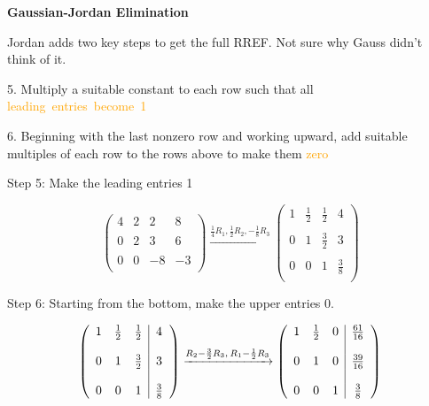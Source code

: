 \documentclass{article}
\begin{document}
\vspace{10pt}

\textbf{Gaussian-Jordan Elimination}

Jordan adds two key steps to get the full RREF. Not sure why Gauss didn't think of it.

5. Multiply a suitable constant to each row such that all \mbox{\textcolor{orange}{leading entries become 1}}

6. Beginning with the last nonzero row and working upward, add suitable multiples of each row to the rows above to make them \textcolor{orange}{zero}

\vspace{10pt}

Step 5: Make the leading entries 1

\[
\left(
\begin{array}{ccc|c}
4 & 2 & 2 & 8 \\ &&& \\
0 & 2 & 3 & 6 \\ &&& \\ 
0 & 0 & -8 & -3 \\
\end{array}
\right)
\xrightarrow{\frac{1}{4}R_1, \frac{1}{2}R_2, -\frac{1}{8}R_3} 
\left(
\begin{array}{ccc|c}
1 & \frac{1}{2} & \frac{1}{2} & 4 \\ &&& \\ 
0 & 1 & \frac{3}{2} & 3 \\ &&& \\ 
0 & 0 & 1 & \frac{3}{8} \\
\end{array}
\right)
\]

\vspace{10pt}

Step 6: Starting from the bottom, make the upper entries 0.

\[
\left(
\begin{array}{ccc|c}
    1 & \frac{1}{2} & \frac{1}{2} & 4 \\ &&& \\ 
    0 & 1 & \frac{3}{2} & 3 \\ &&& \\ 
    0 & 0 & 1 & \frac{3}{8} \\
\end{array}
\right)
\xrightarrow{R_2 - \frac{3}{2}R_3,\\ R_1 - \frac{1}{2}R_3} 
\left(
\begin{array}{ccc|c}
1 & \frac{1}{2} & 0 & \frac{61}{16} \\ &&& \\ 
0 & 1 & 0 & \frac{39}{16} \\ &&& \\ 
0 & 0 & 1 & \frac{3}{8} \\
\end{array}
\right)
\]
\end{document}
